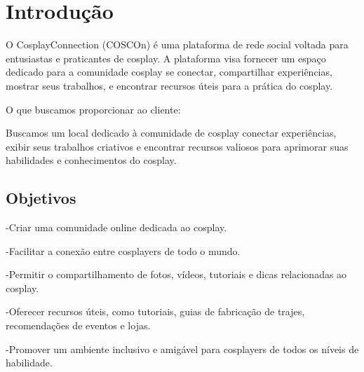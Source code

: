 \documentclass[12pt,a4paper,chapter=TITLE,section=TITLE,subsection=TITLE,subsubsection=TITLE]{article}
\begin{document}



\textual

\section{Introdução}
O CosplayConnection (COSCOn) é uma plataforma de rede social voltada para entusiastas e praticantes de cosplay. A plataforma visa fornecer um espaço dedicado para a comunidade cosplay se conectar, compartilhar experiências, mostrar seus trabalhos, e encontrar recursos úteis para a prática do cosplay.

O que buscamos proporcionar ao cliente:
    \begin{citacao}
   Buscamos um local dedicado à comunidade de cosplay conectar experiências, exibir seus trabalhos criativos e encontrar recursos valiosos para aprimorar suas habilidades e conhecimentos do cosplay.
    \end{citacao}

\subsection{Objetivos}

-Criar uma comunidade online dedicada ao cosplay.

-Facilitar a conexão entre cosplayers de todo o mundo.

-Permitir o compartilhamento de fotos, vídeos, tutoriais e dicas relacionadas ao cosplay.

-Oferecer recursos úteis, como tutoriais, guias de fabricação de trajes, 		recomendações de eventos e lojas.

-Promover um ambiente inclusivo e amigável para cosplayers de todos os níveis de habilidade.
\end{document}
